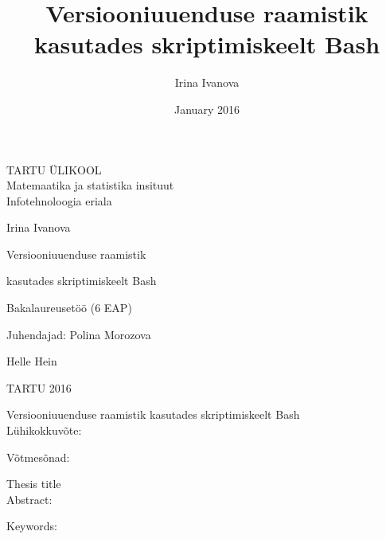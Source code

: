 \documentclass[12pt]{report}
\title{Versiooniuuenduse raamistik kasutades skriptimiskeelt Bash}
\author{Irina Ivanova}
\date{January 2016}
\begin{document}
  \begin{titlepage}
    \begin{center}
      TARTU ÜLIKOOL\\
      Matemaatika ja statistika insituut\\
      Infotehnoloogia eriala
    \end{center}
      
    \vspace{5cm}
    
    \begin{center}  
      {\Large Irina Ivanova}
    \end{center}
    \begin{center}      
      {\huge Versiooniuuenduse raamistik}
    \end{center}
    \begin{center}
      {\huge kasutades skriptimiskeelt Bash}
    \end{center}
    \begin{center}
      {\large Bakalaureusetöö (6 EAP)}
    \end{center}
      
    \vspace{4cm}
    \hspace{6cm}
    Juhendajad: Polina Morozova
    
    \hspace{8.15cm}
    Helle Hein
      
    \vspace{1.5cm}
    \begin{center}
      TARTU 2016
    \end{center}
  \end{titlepage}

  \newpage
  
  Versiooniuuenduse raamistik kasutades skriptimiskeelt Bash\\
  
  Lühikokkuvõte:\\
  \vspace{2cm}

  Võtmesõnad:\\
  \vspace{2cm}

  Thesis title\\

  Abstract:\\
  \vspace{2cm}

  Keywords:
  
  \newpage
 
\end{document}
